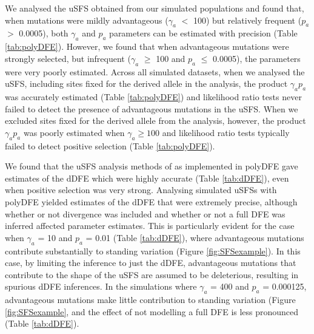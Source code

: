 {	 We analysed the uSFS obtained from our simulated populations and found that, when mutations were mildly advantageous ($\gamma_a$ $<$ 100) but relatively frequent ($p_a$ $>$ 0.0005), both $\gamma_a$ and $p_a$ parameters can be estimated with precision (Table \ref{tab:polyDFE}). However, we found that when advantageous mutations were strongly selected, but infrequent ($\gamma_a$ $\geq$ 100 and $p_a$ $\leq$ 0.0005), the parameters were very poorly estimated. Across all simulated datasets, when we analysed the uSFS, including sites fixed for the derived allele in the analysis, the product $\gamma_a p_a$ was accurately estimated (Table \ref{tab:polyDFE}) and likelihood ratio tests never failed to detect the presence of advantageous mutations in the uSFS. When we excluded sites fixed for the derived allele from the analysis, however, the product  $\gamma_a p_a$  was poorly estimated when $\gamma_a \geq 100$ and likelihood ratio tests typically failed to detect positive selection (Table \ref{tab:polyDFE}). 	 

	We found that the uSFS analysis methods of \cite{RN354} as implemented in polyDFE gave estimates of the dDFE which were highly accurate (Table \ref{tab:dDFE}), even when positive selection was very strong. Analysing simulated uSFSs with polyDFE yielded estimates of the dDFE that were extremely precise, although whether or not divergence was included and whether or not a full DFE was inferred affected parameter estimates. This is particularly evident for the case when $\gamma_a$ = 10 and $p_a$ = 0.01 (Table \ref{tab:dDFE}), where advantageous mutations contribute substantially to standing variation (Figure \ref{fig:SFSexample}). In this case, by limiting the inference to just the dDFE, advantageous mutations that contribute to the shape of the uSFS are assumed to be deleterious, resulting in spurious dDFE inferences. In the simulations where $\gamma_a$ = 400 and $p_a$ = 0.000125, advantageous mutations make little contribution to standing variation (Figure \ref{fig:SFSexample}, and the effect of not modelling a full DFE is less pronounced (Table \ref{tab:dDFE}).
	

}
